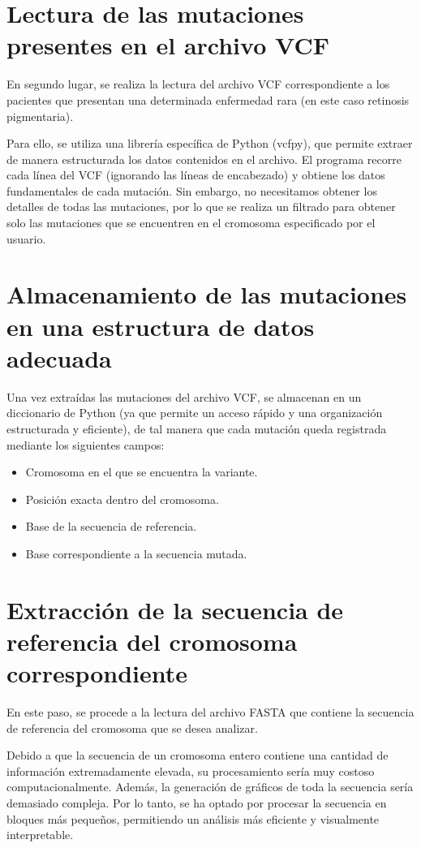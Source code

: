 \documentclass[11pt,spanish,listoffigures,listoftables]{tfgetsinf}
\begin{document}
\section{Lectura de las mutaciones presentes en el archivo \acs{VCF}}

En segundo lugar, se realiza la lectura del archivo \acs{VCF} correspondiente a los pacientes que presentan una determinada enfermedad rara (en este caso retinosis pigmentaria). 

Para ello, se utiliza una librería específica de Python (vcfpy), que permite extraer de manera estructurada los datos contenidos en el archivo. El programa recorre cada línea del \acs{VCF} (ignorando las líneas de encabezado) y obtiene los datos fundamentales de cada mutación. Sin embargo, no necesitamos obtener los detalles de todas las mutaciones, por lo que se realiza un filtrado para obtener solo las mutaciones que se encuentren en el cromosoma especificado por el usuario. 


\section{Almacenamiento de las mutaciones en una estructura de datos adecuada}

Una vez extraídas las mutaciones del archivo \acs{VCF}, se almacenan en un diccionario de Python (ya que permite un acceso rápido y una organización estructurada y eficiente), de tal manera que cada mutación queda registrada mediante los siguientes campos: 

\begin{itemize}
   \item Cromosoma en el que se encuentra la variante.
   \item Posición exacta dentro del cromosoma.
   \item Base de la secuencia de referencia.
   \item Base correspondiente a la secuencia mutada.
\end{itemize}

\section{Extracción de la secuencia de referencia del cromosoma correspondiente}

En este paso, se procede a la lectura del archivo \acs{FASTA} que contiene la secuencia de referencia del cromosoma que se desea analizar.  

Debido a que la secuencia de un cromosoma entero contiene una cantidad de información extremadamente elevada, su procesamiento sería muy costoso computacionalmente. Además, la generación de gráficos de toda la secuencia sería demasiado compleja. Por lo tanto, se ha optado por procesar la secuencia en bloques más pequeños, permitiendo un análisis más eficiente y visualmente interpretable. 
\end{document}
